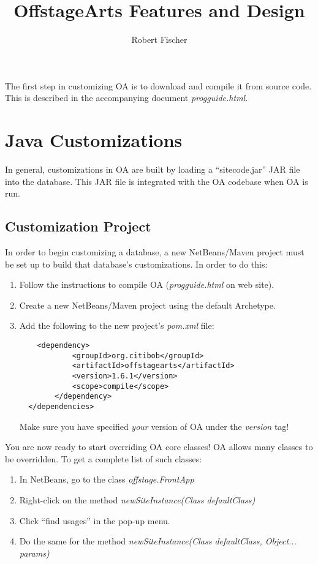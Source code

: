 \documentclass[11pt]{article}
\title{OffstageArts Features and Design}
\author{Robert Fischer}
\begin{document}
\maketitle

The first step in customizing OA is to download and compile it from source code.  This is described in the accompanying document \emph{progguide.html}.


\section{Java Customizations}

In general, customizations in OA are built by loading a ``sitecode.jar'' JAR file into the database.  This JAR file is integrated with the OA codebase when OA is run.

\subsection{Customization Project}

In order to begin customizing a database, a new NetBeans/Maven project must be set up to build that database's customizations.  In order to do this:

\begin{enumerate}
 \item Follow the instructions to compile OA (\emph{progguide.html} on web site).
 \item Create a new NetBeans/Maven project using the default Archetype.
 \item Add the following to the new project's \emph{pom.xml} file:
\begin{verbatim}
    <dependency>
            <groupId>org.citibob</groupId>
            <artifactId>offstagearts</artifactId>
            <version>1.6.1</version>
            <scope>compile</scope>
        </dependency>
  </dependencies>
\end{verbatim}
Make sure you have specified \emph{your} version of OA under the \emph{version} tag!
\end{enumerate}

You are now ready to start overriding OA core classes!  OA allows many classes to be overridden.  To get a complete list of such classes:
 \begin{enumerate}
 \item In NetBeans, go to the class \emph{offstage.FrontApp}
 \item Right-click on the method \emph{newSiteInstance(Class defaultClass)}
 \item Click ``find usages'' in the pop-up menu.
 \item Do the same for the method \emph{newSiteInstance(Class defaultClass, Object... params)}
 \end{enumerate}
\end{document}
